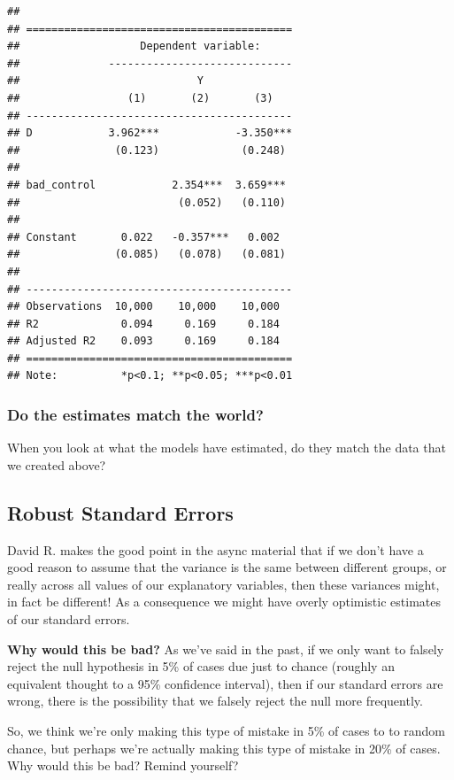 \documentclass[
]{article}
\theoremstyle{definition}
\theoremstyle{definition}
\theoremstyle{definition}
\theoremstyle{definition}
\theoremstyle{remark}
\begin{document}
\begin{verbatim}
## 
## ==========================================
##                   Dependent variable:     
##              -----------------------------
##                            Y              
##                 (1)       (2)       (3)   
## ------------------------------------------
## D            3.962***            -3.350***
##               (0.123)             (0.248) 
##                                           
## bad_control            2.354***  3.659*** 
##                         (0.052)   (0.110) 
##                                           
## Constant       0.022   -0.357***   0.002  
##               (0.085)   (0.078)   (0.081) 
##                                           
## ------------------------------------------
## Observations  10,000    10,000    10,000  
## R2             0.094     0.169     0.184  
## Adjusted R2    0.093     0.169     0.184  
## ==========================================
## Note:          *p<0.1; **p<0.05; ***p<0.01
\end{verbatim}

\subsubsection{Do the estimates match the world?}\label{do-the-estimates-match-the-world}

When you look at what the models have estimated, do they match the data that we created above?

\subsection{Robust Standard Errors}\label{robust-standard-errors}

David R. makes the good point in the async material that if we don't have a good reason to assume that the variance is the same between different groups, or really across all values of our explanatory variables, then these variances might, in fact be different! As a consequence we might have overly optimistic estimates of our standard errors.

\textbf{Why would this be bad?} As we've said in the past, if we only want to falsely reject the null hypothesis in 5\% of cases due just to chance (roughly an equivalent thought to a 95\% confidence interval), then if our standard errors are wrong, there is the possibility that we falsely reject the null more frequently.

So, we think we're only making this type of mistake in 5\% of cases to to random chance, but perhaps we're actually making this type of mistake in 20\% of cases. Why would this be bad? Remind yourself?
\end{document}

